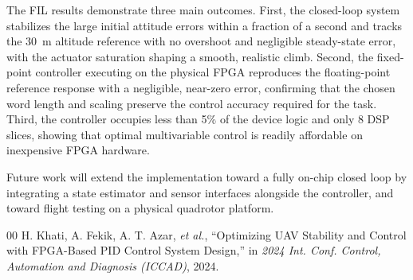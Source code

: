 \documentclass[conference]{IEEEtran}
\begin{document}
The FIL results demonstrate three main outcomes. First, the closed-loop system stabilizes the large initial attitude errors within a fraction of a second and tracks the 30~m altitude reference with no overshoot and negligible steady-state error, with the actuator saturation shaping a smooth, realistic climb. Second, the fixed-point controller executing on the physical FPGA reproduces the floating-point reference response with a negligible, near-zero error, confirming that the chosen word length and scaling preserve the control accuracy required for the task. Third, the controller occupies less than 5\% of the device logic and only 8 DSP slices, showing that optimal multivariable control is readily affordable on inexpensive FPGA hardware.

Future work will extend the implementation toward a fully on-chip closed loop by integrating a state estimator and sensor interfaces alongside the controller, and toward flight testing on a physical quadrotor platform.

\begin{thebibliography}{00}
 H. Khati, A. Fekik, A. T. Azar, \textit{et al.}, ``Optimizing UAV Stability and Control with FPGA-Based PID Control System Design,'' in \textit{2024 Int. Conf. Control, Automation and Diagnosis (ICCAD)}, 2024.
\end{thebibliography}
\end{document}
